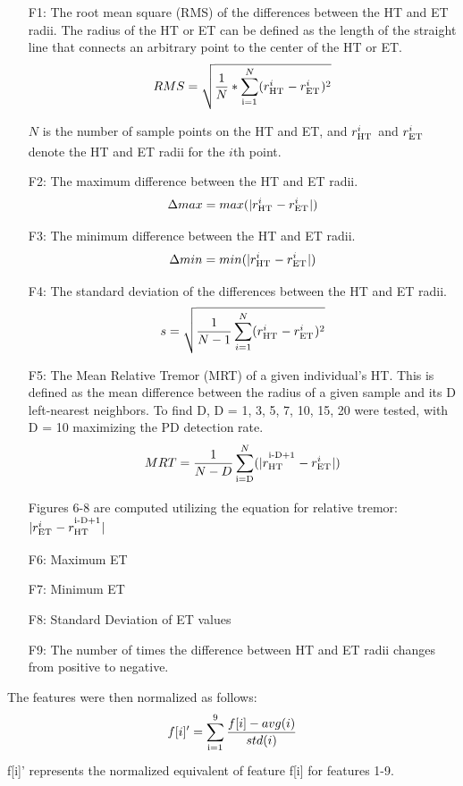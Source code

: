 \documentclass[pmlr,twocolumn,10pt,breaklinks, x11names,table]{jmlr} %
\let\SUP\textsuperscript
\newcommand\red[1]{{\color{red}#1}}
\begin{document}
\begin{enumerate}
\item[F1:] The root mean square (RMS) of the differences between the HT and ET radii. The radius of the HT or ET can be defined as the length of the straight line that connects an arbitrary point to the center of the HT or ET. 
\[RMS = \sqrt{\frac{1}{N} * \sum_\SUP{i=1}^N(r_\SUP{HT}^i - r_\SUP{ET}^i)^2}\]

$N$ is the number of sample points on the HT and ET, and $r_\SUP{HT}^i$ and $r_\SUP{ET}^i$ denote the HT and ET radii for the $i$th point.

\item[F2:] The maximum difference between the HT and ET radii. 
\[\Delta max = max(|r_\SUP{HT}^i - r_\SUP{ET}^i|)\]

\item[F3:] The minimum difference between the HT and ET radii. 
\[\Delta min = min(|r_\SUP{HT}^i - r_\SUP{ET}^i|)\]

\item[F4:] The standard deviation of the differences between the HT and ET radii. 
\[s = \sqrt{\frac{1}{N-1}\sum_{i=1}^N(r_\SUP{HT}^i - r_\SUP{ET}^i)^2}\]

\item[F5:] The Mean Relative Tremor (MRT) of a given individual’s HT. This is defined as the mean difference between the radius of a given sample and its D left-nearest neighbors. To find D, D = {1, 3, 5, 7, 10, 15, 20} were tested, with D = 10 maximizing the PD detection rate. 
\[MRT = \frac{1}{N-D}\sum_\SUP{i=D}^N(|r_\SUP{HT}^\SUP{i-D+1} - r_\SUP{ET}^i|)\]

Figures 6-8 are computed utilizing the equation for relative tremor: $|r_\SUP{ET}^i - r_\SUP{HT}^\SUP{i-D+1}|$
\item[F6:] Maximum ET
\item[F7:] Minimum ET
\item[F8:] Standard Deviation of ET values
\item[F9:] The number of times the difference between HT and ET radii changes from positive to negative.
\end{enumerate}

The features were then normalized as follows:
\[f[i]' = \sum_\SUP{i=1}^9\frac{f[i] - avg(i)}{std(i)}\]
f[i]' represents the normalized equivalent of feature f[i] for features 1-9.
\end{document}
